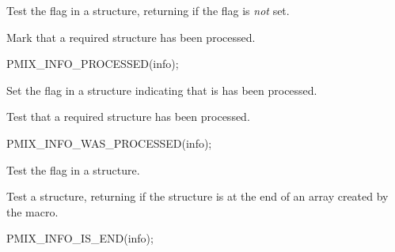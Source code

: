 \begin{arglist}
\end{arglist}

Test the  flag in a  structure, returning  if the flag is \textit{not} set.


Mark that a required  structure has been processed.

\cspecificstart
\begin{codepar}
PMIX_INFO_PROCESSED(info);
\end{codepar}
\cspecificend

\begin{arglist}
\end{arglist}

Set the  flag in a  structure indicating that is has been processed.


Test that a required  structure has been processed.

\cspecificstart
\begin{codepar}
PMIX_INFO_WAS_PROCESSED(info);
\end{codepar}
\cspecificend

\begin{arglist}
\end{arglist}

Test the  flag in a  structure.


Test a  structure, returning  if the structure is at the end of an array created by the  macro.

\cspecificstart
\begin{codepar}
PMIX_INFO_IS_END(info);
\end{codepar}
\cspecificend

